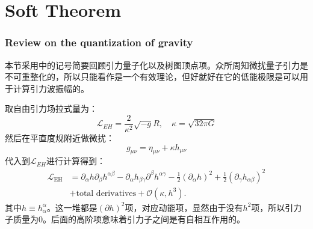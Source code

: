 \part{Soft Theorem}
\setcounter{theorem}{0}
\setcounter{definition}{0}
\setcounter{lemma}{0}
\setcounter{sidenote}{1}
\section{Review on the quantization of gravity}
本节采用\cite{Badger:2023eqz}中的记号简要回顾引力量子化以及树图顶点项。众所周知微扰量子引力是不可重整化的，所以只能看作是一个有效理论，但好就好在它的低能极限是可以用于计算引力波振幅的\cite{Goldberger:2004jt,Bern:2019crd,Mogull:2020sak}。

取自由引力场拉式量为：
\begin{equation}
	\mathcal{L}_{EH}=\frac{2}{\kappa^2}\sqrt{-g}R,\quad \kappa=\sqrt{32\pi G}
\end{equation}
然后在平直度规附近做微扰：
\begin{equation}
	g_{\mu\nu}=\eta_{\mu\nu}+\kappa h_{\mu\nu}
\end{equation}
代入到$\mathcal{L}_{EH}$进行计算得到：
\begin{equation}
	\begin{aligned}
		\mathcal{L}_{\mathrm{EH}}& =\partial_{\alpha}h\partial_{\beta}h^{\alpha\beta}-\partial_{\alpha}h_{\beta\gamma}\partial^{\beta}h^{\alpha\gamma}-\frac{1}{2}(\partial_{\alpha}h)^{2}+\frac{1}{2}(\partial_{\gamma}h_{\alpha\beta})^{2}  \\
		&+\text{total derivatives}+\mathcal{O}\left(\kappa,h^{3}\right).
	\end{aligned}
\end{equation}
其中$h\equiv h^\alpha_\alpha$。这一堆都是$(\partial h)^2$项，对应动能项，显然由于没有$h^2$项，所以引力子质量为0。后面的高阶项意味着引力子之间是有自相互作用的。

